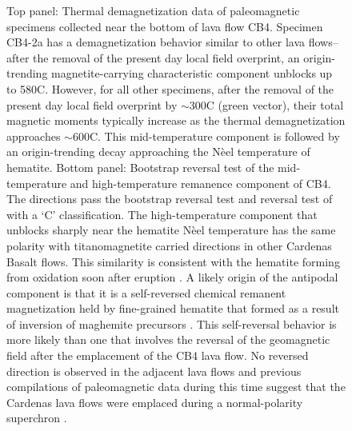 \begin{figure}
\caption[Paleomagnetic data of Cardenas Basalt lava flow site CB4.]{\footnotesize Top panel: Thermal demagnetization data of paleomagnetic specimens collected near the bottom of lava flow CB4. Specimen CB4-2a has a demagnetization behavior similar to other lava flows--after the removal of the present day local field overprint, an origin-trending magnetite-carrying characteristic component unblocks up to 580\textdegree C. However, for all other specimens, after the removal of the present day local field overprint by $\sim$300\textdegree C (green vector), their total magnetic moments typically increase as the thermal demagnetization approaches $\sim$600\textdegree C. This mid-temperature component is followed by an origin-trending decay approaching the N\`eel temperature of hematite. Bottom panel: Bootstrap reversal test \citep{Tauxe1991a} of the mid-temperature and high-temperature remanence component of CB4. The directions pass the bootstrap reversal test and \cite{McFadden1990a} reversal test of  with a `C' classification. The high-temperature component that unblocks sharply near the hematite N\`eel temperature has the same polarity with titanomagnetite carried directions in other Cardenas Basalt flows. This similarity is consistent with the hematite forming from oxidation soon after eruption \citep{Haggerty1967a}. A likely origin of the antipodal component is that it is a self-reversed chemical remanent magnetization held by fine-grained hematite that formed as a result of inversion of maghemite precursors \citep{Hedley1968a, McClelland1987a, McClelland1993a, Swanson-Hysell2011a}. This self-reversal behavior is more likely than one that involves the reversal of the geomagnetic field after the emplacement of the CB4 lava flow. No reversed direction is observed in the adjacent lava flows and previous compilations of paleomagnetic data during this time suggest that the Cardenas lava flows were emplaced during a normal-polarity superchron \citep{Swanson-Hysell2019a, Driscoll2016b}.}
\label{fig:CB4_reversal_test}
\end{figure}

